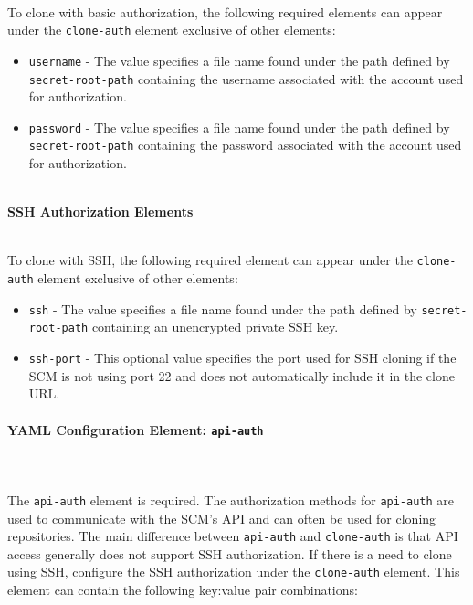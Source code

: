 \noindent\\To clone with basic authorization, the following required elements can appear under the
\texttt{clone-auth} element exclusive of other elements:

\begin{itemize}
    \item \texttt{username} - The value specifies a file name found under the path defined
    by \texttt{secret-root-path} containing the username associated with the account used
    for authorization. 
    \item \texttt{password} - The value specifies a file name found under the path defined
    by \texttt{secret-root-path} containing the password associated with the account used
    for authorization. 
\end{itemize}

\noindent\\\textbf{SSH Authorization Elements}

\noindent\\To clone with SSH, the following required element can appear under the
\texttt{clone-auth} element exclusive of other elements:

\begin{itemize}
    \item \texttt{ssh} - The value specifies a file name found under the path defined
    by \texttt{secret-root-path} containing an unencrypted private SSH key.
    \item \texttt{ssh-port} - This optional value specifies the port used for SSH cloning
    if the SCM is not using port 22 and does not automatically include it in the clone
    URL.
\end{itemize}

\paragraph{YAML Configuration Element: \texttt{api-auth} }\label{sec:api-auth-element}

\noindent\\\\The \texttt{api-auth} element is required.  The authorization methods for \texttt{api-auth} 
are used to communicate with the SCM's API and can often be used for cloning repositories.  The
main difference between \texttt{api-auth} and \texttt{clone-auth} is that API access generally
does not support SSH authorization. If there is a need to clone using SSH, configure the SSH
authorization under the \texttt{clone-auth} element.  This element can contain the following
key:value pair combinations:

